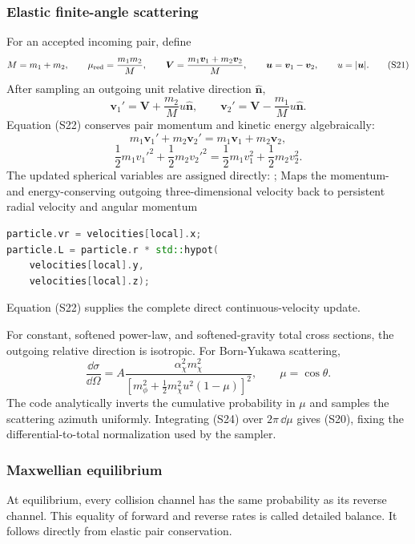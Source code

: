 \subsubsection{Elastic finite-angle scattering}

For an accepted incoming pair, define
\[
 M=m_1+m_2,\qquad
 \mu_{\rm red}=\frac{m_1m_2}{M},\qquad
 \bm V=\frac{m_1\bm v_1+m_2\bm v_2}{M},\qquad
 \bm u=\bm v_1-\bm v_2,\qquad u=|\bm u|.                   \tag{S21}
\]
After sampling an outgoing unit relative direction \(\hat{\bm n}\),
\[
 \bm v_1'=\bm V+\frac{m_2}{M}u\hat{\bm n},\qquad
 \bm v_2'=\bm V-\frac{m_1}{M}u\hat{\bm n}.                 \tag{S22}
\]
Equation (S22) conserves pair momentum and kinetic energy algebraically:
\[
 m_1\bm v_1'+m_2\bm v_2'
 =m_1\bm v_1+m_2\bm v_2,
\]
\[
 \frac12m_1v_1'^2+\frac12m_2v_2'^2
 =\frac12m_1v_1^2+\frac12m_2v_2^2.                        \tag{S23}
\]
The updated spherical variables are assigned directly:
{;
 }
{Maps the momentum- and energy-conserving outgoing three-dimensional velocity
 back to persistent radial velocity and angular momentum}
\begin{lstlisting}[language=C++]
particle.vr = velocities[local].x;
particle.L = particle.r * std::hypot(
    velocities[local].y,
    velocities[local].z);
\end{lstlisting}
Equation (S22) supplies the complete direct continuous-velocity update.

For constant, softened power-law, and softened-gravity total cross sections,
the outgoing relative direction is isotropic.  For Born-Yukawa scattering,
\[
 \frac{\dd\sigma}{\dd\Omega}
 =A\frac{\alpha_\chi^2m_\chi^2}
 {\left[
 m_\phi^2+\tfrac12m_\chi^2u^2(1-\mu)
 \right]^2},\qquad \mu=\cos\theta.                         \tag{S24}
\]
The code analytically inverts the cumulative probability in \(\mu\) and
samples the scattering azimuth uniformly.  Integrating (S24) over
\(2\pi\,\dd\mu\) gives (S20), fixing the differential-to-total normalization
used by the sampler.

\subsubsection{Maxwellian equilibrium}

At equilibrium, every collision channel has the same probability as its
reverse channel.  This equality of forward and reverse rates is called
detailed balance.  It follows directly from elastic pair conservation.

